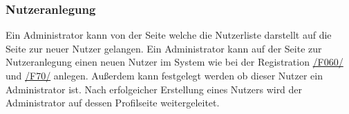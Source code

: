\subsubsection{Nutzeranlegung}
\begin{description}
     Ein Administrator kann von der Seite welche die Nutzerliste darstellt auf die Seite zur
    neuer Nutzer gelangen.
     Ein Administrator kann auf der Seite zur Nutzeranlegung
    einen neuen Nutzer im System wie bei der Registration \hyperref[funkt:060]{/F060/} und \hyperref[funkt:070]{/F70/}
    anlegen. Außerdem kann festgelegt werden ob dieser Nutzer ein Administrator ist.
     Nach erfolgeicher Erstellung eines Nutzers wird der Administrator auf dessen Profilseite weitergeleitet.
\end{description}